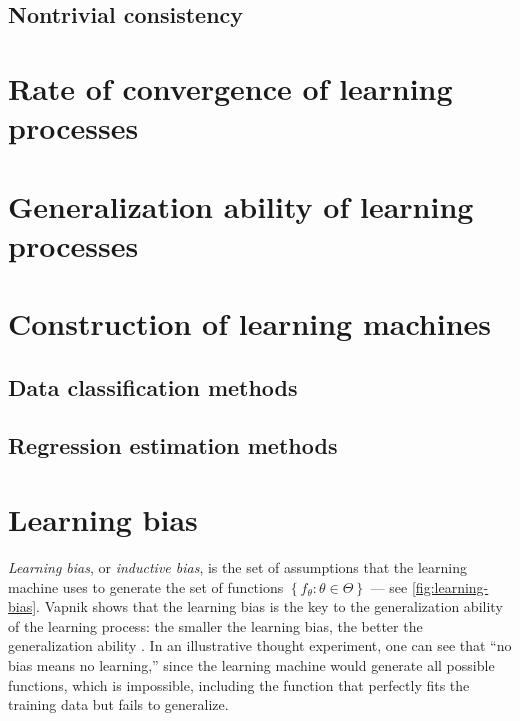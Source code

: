 \subsection{Nontrivial consistency}


\section{Rate of convergence of learning processes}

\section{Generalization ability of learning processes}

\section{Construction of learning machines}

\subsection{Data classification methods}

\subsection{Regression estimation methods}

\newpage
\section{Learning bias}

\emph{Learning bias}, or \emph{inductive bias}, is the set of assumptions that the
learning machine uses to generate the set of functions $\left\{ f_\theta : \theta \in
\Theta \right\}$ --- see \cref{fig:learning-bias}.  Vapnik shows that the learning bias is the key to the generalization
ability of the learning process: the smaller the learning bias, the better the
generalization ability \parencite{Vapnik1999b}.  In an illustrative thought experiment,
one can see that ``no bias means no learning,'' since the learning machine would generate
all possible functions, which is impossible, including the function that perfectly fits
the training data but fails to generalize.


